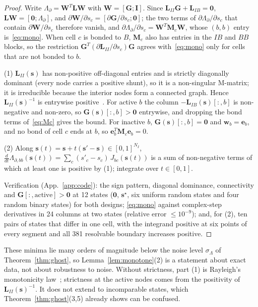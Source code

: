 \documentclass[11pt,a4paper]{article}
\theoremstyle{definition}
\theoremstyle{remark}
\begin{document}
\begin{proof}
Write $\Lambda_\partial = \mathbf{W}^T\mathbf{L}\mathbf{W}$ with $\mathbf{W} = [\mathbf{G};\mathbf{I}]$. Since $\mathbf{L}_{II}\mathbf{G}+\mathbf{L}_{IB} = \mathbf{0}$, $\mathbf{L}\mathbf{W} = [\mathbf{0};\Lambda_\partial]$, and $\partial\mathbf{W}/\partial s_c = [\partial\mathbf{G}/\partial s_c;\mathbf{0}]$; the two terms of $\partial\Lambda_\partial/\partial s_c$ that contain $\partial\mathbf{W}/\partial s_c$ therefore vanish, and $\partial\Lambda_\partial/\partial s_c = \mathbf{W}^T\mathbf{M}_c\mathbf{W}$, whose $(b,b)$ entry is~\eqref{eq:mono}. When cell $c$ is bonded to $B$, $\mathbf{M}_c$ also has entries in the $IB$ and $BB$ blocks, so the restriction $\mathbf{G}^T(\partial\mathbf{L}_{II}/\partial s_c)\mathbf{G}$ agrees with~\eqref{eq:mono} only for cells that are not bonded to $b$.

(1) $\mathbf{L}_{II}(\mathbf{s})$ has non-positive off-diagonal entries and is strictly diagonally dominant (every node carries a positive shunt), so it is a non-singular M-matrix; it is irreducible because the interior nodes form a connected graph. Hence $\mathbf{L}_{II}(\mathbf{s})^{-1}$ is entrywise positive~\cite{berman1994}. For active $b$ the column $-\mathbf{L}_{IB}(\mathbf{s})[:,b]$ is non-negative and non-zero, so $\mathbf{G}(\mathbf{s})[:,b] > \mathbf{0}$ entrywise, and dropping the bond terms of~\eqref{eq:Mc} gives the bound. For inactive $b$, $\mathbf{G}(\mathbf{s})[:,b] = \mathbf{0}$ and $\mathbf{w}_b = \mathbf{e}_b$, and no bond of cell $c$ ends at $b$, so $\mathbf{e}_b^T\mathbf{M}_c\mathbf{e}_b = 0$.

(2) Along $\mathbf{s}(t) = \mathbf{s}+t(\mathbf{s}'-\mathbf{s})\in[0,1]^{N_I}$, $\frac{d}{dt}\Lambda_{\partial,bb}(\mathbf{s}(t)) = \sum_c (s'_c-s_c)\,J_{bc}(\mathbf{s}(t))$ is a sum of non-negative terms of which at least one is positive by (1); integrate over $t\in[0,1]$.

Verification (App.~\ref{app:code}): the sign pattern, diagonal dominance, connectivity and $\mathbf{G}[:,\text{active}] > \mathbf{0}$ at 12 states ($\mathbf{0}$, $\mathbf{s}^\star$, six uniform random states and four random binary states) for both designs; \eqref{eq:mono} against complex-step derivatives in 24 columns at two states (relative error $\le 10^{-9}$); and, for (2), ten pairs of states that differ in one cell, with the integrand positive at six points of every segment and all 381 resolvable boundary increases positive.
\end{proof}
These minima lie many orders of magnitude below the noise level $\sigma_\Lambda$ of Theorem~\ref{thm:ghost}, so Lemma~\ref{lem:monotone}(2) is a statement about exact data, not about robustness to noise. Without strictness, part (1) is Rayleigh's monotonicity law~\cite{doyle1984}; strictness at the active nodes comes from the positivity of $\mathbf{L}_{II}(\mathbf{s})^{-1}$. It does not extend to incomparable states, which Theorem~\ref{thm:ghost}(3,5) already shows can be confused.
\end{document}
